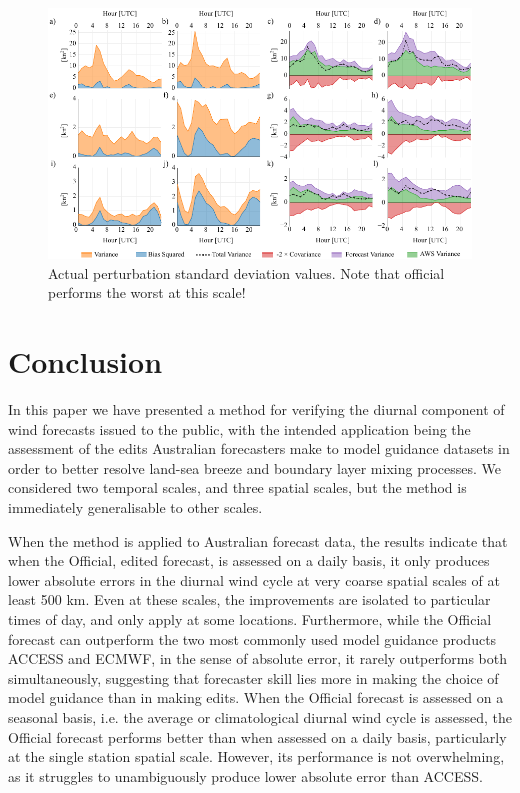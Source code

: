 \documentclass{ametsoc}
\begin{document}
\begin{figure}
\centering
\includegraphics[width=39pc]{error_decomp_v.pdf}
\caption{Actual perturbation standard deviation values. Note that official performs the worst at this scale!}
\label{Fig:error_decomp_v}
\end{figure}

\section{Conclusion}
\label{Sec:Conclusion}
In this paper we have presented a method for verifying the diurnal component of wind forecasts issued to the public, with the intended application being the assessment of the edits Australian forecasters make to model guidance datasets in order to better resolve land-sea breeze and boundary layer mixing processes. We considered two temporal scales, and three spatial scales, but the method is immediately generalisable to other scales. 

When the method is applied to Australian forecast data, the results indicate that when the Official, edited forecast, is assessed on a daily basis, it only produces lower absolute errors in the diurnal wind cycle at very coarse spatial scales of at least 500 km. Even at these scales, the improvements are isolated to particular times of day, and only apply at some locations. Furthermore, while the Official forecast can outperform the two most commonly used model guidance products ACCESS and ECMWF, in the sense of absolute error, it rarely outperforms both simultaneously, suggesting that forecaster skill lies more in making the choice of model guidance than in making edits. When the Official forecast is assessed on a seasonal basis, i.e. the average or climatological diurnal wind cycle is assessed, the Official forecast performs better than when assessed on a daily basis, particularly at the single station spatial scale. However, its performance is not overwhelming, as it struggles to unambiguously produce lower absolute error than ACCESS. 
\end{document}
